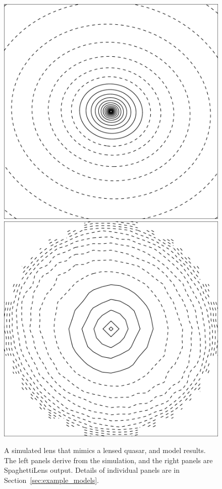 \documentclass[usenatbib]{mn2e}
\newcommand{\spl}{SpaghettiLens\xspace}
\newcommand{\secref}[1]{Section~\ref{sec:#1}}
\newlength{\myplotswidth}
\begin{document}
\begin{figure}
  \includegraphics[width=\myplotswidth]{fig/ASW000102p_006941_kappa}
  \includegraphics[width=\myplotswidth]{fig/006941_mass}
  \caption[result 6941 (ASW000102p)]{A simulated lens that mimics a
    lensed quasar, and model results.  The left panels derive from the
    simulation, and the right panels are \spl output.  Details of
    individual panels are in \secref{example_models}.}

  \label{fig:6941}
\end{figure}
\end{document}
